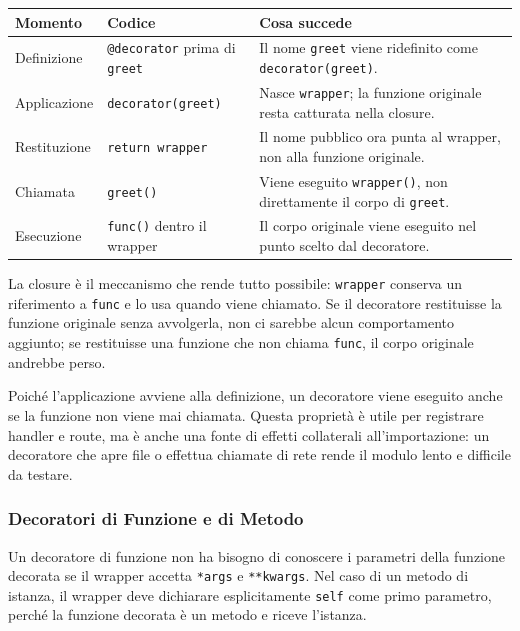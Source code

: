 \documentclass[12pt]{extarticle}
\begin{document}
\begin{center}
\small
\begin{tabular}{p{2.8cm}p{4.6cm}p{6.8cm}}
    \toprule
    \textbf{Momento} & \textbf{Codice} & \textbf{Cosa succede} \\
    \midrule
    Definizione & \texttt{@decorator} prima di \texttt{greet} & Il nome \texttt{greet} viene ridefinito come \texttt{decorator(greet)}. \\
    \addlinespace
    Applicazione & \texttt{decorator(greet)} & Nasce \texttt{wrapper}; la funzione originale resta catturata nella closure. \\
    \addlinespace
    Restituzione & \texttt{return wrapper} & Il nome pubblico ora punta al wrapper, non alla funzione originale. \\
    \addlinespace
    Chiamata & \texttt{greet()} & Viene eseguito \texttt{wrapper()}, non direttamente il corpo di \texttt{greet}. \\
    \addlinespace
    Esecuzione & \texttt{func()} dentro il wrapper & Il corpo originale viene eseguito nel punto scelto dal decoratore. \\
    \bottomrule
\end{tabular}
\end{center}

\noindent La closure è il meccanismo che rende tutto possibile: \texttt{wrapper} conserva un riferimento a \texttt{func} e lo usa quando viene chiamato. Se il decoratore restituisse la funzione originale senza avvolgerla, non ci sarebbe alcun comportamento aggiunto; se restituisse una funzione che non chiama \texttt{func}, il corpo originale andrebbe perso.

\noindent Poiché l'applicazione avviene alla definizione, un decoratore viene eseguito anche se la funzione non viene mai chiamata. Questa proprietà è utile per registrare handler e route, ma è anche una fonte di effetti collaterali all'importazione: un decoratore che apre file o effettua chiamate di rete rende il modulo lento e difficile da testare.

\subsubsection{Decoratori di Funzione e di Metodo}

\noindent Un decoratore di funzione non ha bisogno di conoscere i parametri della funzione decorata se il wrapper accetta \texttt{*args} e \texttt{**kwargs}. Nel caso di un metodo di istanza, il wrapper deve dichiarare esplicitamente \texttt{self} come primo parametro, perché la funzione decorata è un metodo e riceve l'istanza.
\end{document}
